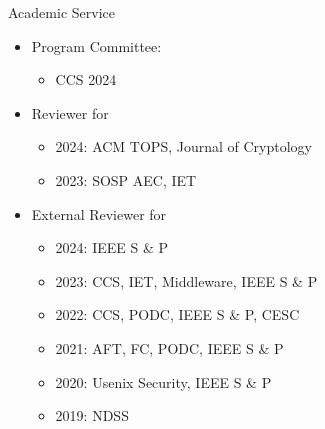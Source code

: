 \documentclass{resume}
\begin{document}
\begin{rSection}{Academic Service}
\label{sec:orgc561dae}
\begin{itemize}
\item Program Committee:
\begin{itemize}
\item CCS 2024
\end{itemize}
\end{itemize}
\begin{itemize}
\item Reviewer for
\begin{itemize}
\item 2024: ACM TOPS, Journal of Cryptology
\item 2023: SOSP AEC, IET
\end{itemize}
\item External Reviewer for
\begin{itemize}
\item 2024: IEEE S \& P
\item 2023: CCS, IET, Middleware, IEEE S \& P
\item 2022: CCS, PODC, IEEE S \& P, CESC
\item 2021: AFT, FC, PODC, IEEE S \& P
\item 2020: Usenix Security, IEEE S \& P
\item 2019: NDSS
\end{itemize}
\end{itemize}
\end{rSection}
\end{document}
